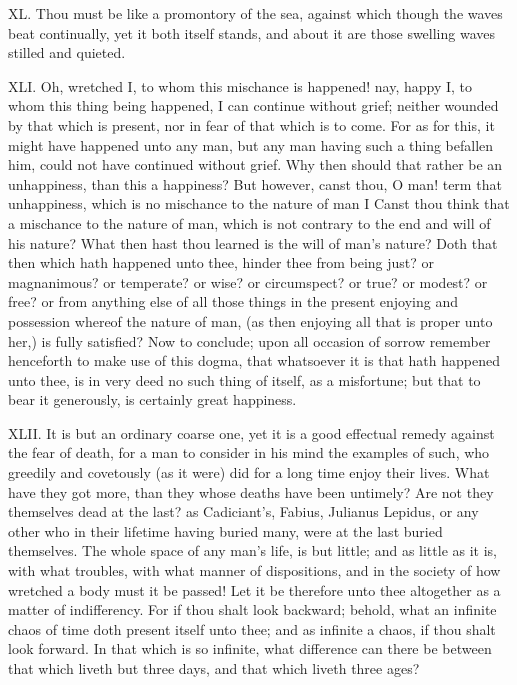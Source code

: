 XL. Thou must be like a promontory of the sea, against which though
the waves beat continually, yet it both itself stands, and about it are
those swelling waves stilled and quieted.

XLI. Oh, wretched I, to whom this mischance is happened! nay, happy I,
to whom this thing being happened, I can continue without grief; neither
wounded by that which is present, nor in fear of that which is to come.
For as for this, it might have happened unto any man, but any man having
such a thing befallen him, could not have continued without grief. Why
then should that rather be an unhappiness, than this a happiness? But
however, canst thou, O man! term that unhappiness, which is no mischance
to the nature of man I Canst thou think that a mischance to the nature of
man, which is not contrary to the end and will of his nature? What then
hast thou learned is the will of man's nature? Doth that then which hath
happened unto thee, hinder thee from being just? or magnanimous? or
temperate? or wise? or circumspect? or true? or modest? or free? or from
anything else of all those things in the present enjoying and possession
whereof the nature of man, (as then enjoying all that is proper unto her,)
is fully satisfied? Now to conclude; upon all occasion of sorrow remember
henceforth to make use of this dogma, that whatsoever it is that hath
happened unto thee, is in very deed no such thing of itself, as a
misfortune; but that to bear it generously, is certainly great happiness.

XLII. It is but an ordinary coarse one, yet it is a good effectual
remedy against the fear of death, for a man to consider in his mind the
examples of such, who greedily and covetously (as it were) did for a long
time enjoy their lives. What have they got more, than they whose deaths
have been untimely? Are not they themselves dead at the last? as
Cadiciant's, Fabius, Julianus Lepidus, or any other who in their lifetime
having buried many, were at the last buried themselves. The whole space of
any man's life, is but little; and as little as it is, with what troubles,
with what manner of dispositions, and in the society of how wretched a
body must it be passed! Let it be therefore unto thee altogether as a
matter of indifferency. For if thou shalt look backward; behold, what an
infinite chaos of time doth present itself unto thee; and as infinite a
chaos, if thou shalt look forward. In that which is so infinite, what
difference can there be between that which liveth but three days, and that
which liveth three ages?

